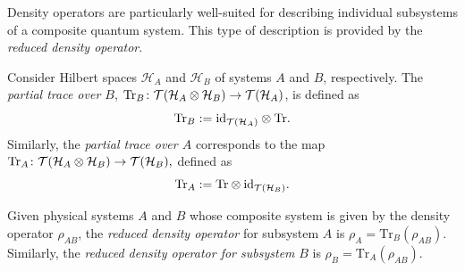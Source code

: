 Density operators are particularly well-suited for describing individual subsystems of a composite quantum system. This type of description is provided by the \emph{reduced density operator}.

\begin{definition}
Consider Hilbert spaces $\mathcal{H}_A$ and $\mathcal{H}_B$ of systems $A$ and $B$, respectively. The \emph{partial trace over $B$}, $\text{Tr}_B \colon \mathcal{T}(\mathcal{H}_A \otimes \mathcal{H}_B) \to \mathcal{T}(\mathcal{H}_A)$,
is defined as
\[
\text{Tr}_B := \text{id}_{\mathcal{T}(\mathcal{H}_A)} \otimes \text{Tr}.
\]
Similarly, the \emph{partial trace over $A$} corresponds to the map \(
\text{Tr}_A \colon \mathcal{T}(\mathcal{H}_A \otimes \mathcal{H}_B) \to \mathcal{T}(\mathcal{H}_B),
\)
defined as 
\[
\text{Tr}_A := \text{Tr} \otimes \text{id}_{\mathcal{T}(\mathcal{H}_B)}.
\]
\end{definition}

\begin{definition}
Given physical systems $A$ and $B$ whose composite system is given by the density operator $\rho_{AB}$, the \emph{reduced density operator} for subsystem $A$ is $\rho_{A} = \text{Tr}_{B}(\rho_{AB}).$
Similarly, the \emph{reduced density operator for subsystem} $B$ is $\rho_{B} = \text{Tr}_{A}(\rho_{AB})$.
\end{definition}

